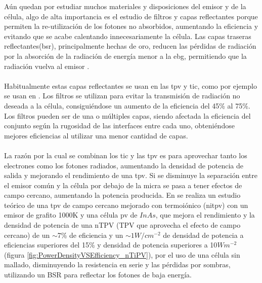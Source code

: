 Aún quedan por estudiar muchos materiales y disposiciones del emisor y de la célula, algo de alta importancia es el estudio de filtros y capas reflectantes porque permiten la re-utilización de los fotones no absorbidos, aumentando la eficiencia y evitando que se acabe calentando innecesariamente la célula. Las capas traseras reflectantes(\acrshort{bsr}), principalmente hechas de oro, reducen las pérdidas de radiación por la absorción de la radiación de energía menor a la \acrshort{ebg}, permitiendo que la radiación vuelva al emisor \cite{nTPV_Review}.\\\\
Habitualmente estas capas reflectantes se usan en las \acrshort{tpv} y \acrshort{tic}, como por ejemplo se usan en \cite{thermoionic_TPV_NF,modelEfficiency_NF_TPV,thermophotovoltaic_40}. Los filtros se utilizan para evitar la transmisión de radiación no deseada a la célula, consiguiéndose un aumento de la eficiencia del 45\% al 75\%. Los filtros pueden ser de una o múltiples capas, siendo afectada la eficiencia del conjunto según la rugosidad de las interfaces entre cada uno, obteniéndose mejores eficiencias al utilizar una menor cantidad de capas\cite{multiLayerFilters}.\\\\
La razón por la cual se combinan los \acrshort{tic} y las \acrshort{tpv} es para aprovechar tanto los electrones como los fotones radiados, aumentando la densidad de potencia de salida y mejorando el rendimiento de una \acrshort{tpv}. Si se disminuye la separación entre el emisor común y la célula por debajo de la micra se pasa a tener efectos de campo cercano, aumentando la potencia producida. En \cite{thermoionic_TPV_NF} se realiza un estudio teórico de una \acrshort{tpv} de campo cercano mejorado con termoiónico (\acrshort{nitpv}) con un emisor de grafito 1000K y una célula \acrshort{pv} de $InAs$, que mejora el rendimiento y la densidad de potencia de una nTPV (TPV que aprovecha el efecto de campo cercano) de un $\sim$7\% de eficiencia y un $\sim 1 W/cm^{-2}$ de densidad de potencia a eficiencias superiores del 15\% y  densidad de potencia superiores a 10$Wm^{-2}$ (figura \ref{fig:PowerDensityVSEfficiency_nTiPV}), por el uso de una célula sin mallado, disminuyendo la resistencia en serie y las pérdidas por sombras, utilizando un BSR para reflectar los fotones de baja energía.\\
